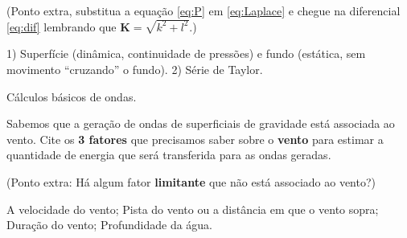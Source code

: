 \documentclass[letterpaper,portuguese,12pt,pdftex]{exam}
\begin{document}
\begin{questions}
\begin{parts}
  (Ponto extra, substitua a equação \ref{eq:P} em \ref{eq:Laplace} e chegue na
  diferencial \ref{eq:dif} lembrando que $\mathbf{K} = \sqrt{k^2 + l^2}$.)


  \begin{solution}
  1) Superfície (dinâmica, continuidade de pressões) e fundo (estática, sem
     movimento ``cruzando'' o fundo).
  2) Série de Taylor.
  \end{solution}
\end{parts}

  \question
  Cálculos básicos de ondas.

\question[3]
  Sabemos que a geração de ondas de superficiais de gravidade está associada ao
  vento.  Cite os {\bf 3 fatores} que precisamos saber sobre o {\bf vento} para
  estimar a quantidade de energia que será transferida para as ondas geradas.

  (Ponto extra: Há algum fator {\bf limitante} que não está associado ao vento?)

  \begin{solution}
  A velocidade do vento;
  Pista do vento ou a distância em que o vento sopra;
  Duração do vento;
  Profundidade da água.
  \end{solution}


\end{questions}
\end{document}
